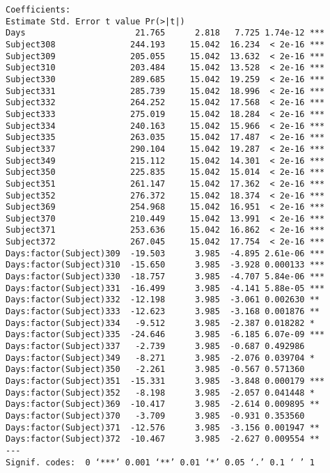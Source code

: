 \documentclass[12pt,letterpaper]{article}
\begin{document}
\begin{enumerate}
\begin{Verbatim}
Coefficients:
Estimate Std. Error t value Pr(>|t|)    
Days                      21.765      2.818   7.725 1.74e-12 ***
Subject308               244.193     15.042  16.234  < 2e-16 ***
Subject309               205.055     15.042  13.632  < 2e-16 ***
Subject310               203.484     15.042  13.528  < 2e-16 ***
Subject330               289.685     15.042  19.259  < 2e-16 ***
Subject331               285.739     15.042  18.996  < 2e-16 ***
Subject332               264.252     15.042  17.568  < 2e-16 ***
Subject333               275.019     15.042  18.284  < 2e-16 ***
Subject334               240.163     15.042  15.966  < 2e-16 ***
Subject335               263.035     15.042  17.487  < 2e-16 ***
Subject337               290.104     15.042  19.287  < 2e-16 ***
Subject349               215.112     15.042  14.301  < 2e-16 ***
Subject350               225.835     15.042  15.014  < 2e-16 ***
Subject351               261.147     15.042  17.362  < 2e-16 ***
Subject352               276.372     15.042  18.374  < 2e-16 ***
Subject369               254.968     15.042  16.951  < 2e-16 ***
Subject370               210.449     15.042  13.991  < 2e-16 ***
Subject371               253.636     15.042  16.862  < 2e-16 ***
Subject372               267.045     15.042  17.754  < 2e-16 ***
Days:factor(Subject)309  -19.503      3.985  -4.895 2.61e-06 ***
Days:factor(Subject)310  -15.650      3.985  -3.928 0.000133 ***
Days:factor(Subject)330  -18.757      3.985  -4.707 5.84e-06 ***
Days:factor(Subject)331  -16.499      3.985  -4.141 5.88e-05 ***
Days:factor(Subject)332  -12.198      3.985  -3.061 0.002630 ** 
Days:factor(Subject)333  -12.623      3.985  -3.168 0.001876 ** 
Days:factor(Subject)334   -9.512      3.985  -2.387 0.018282 *  
Days:factor(Subject)335  -24.646      3.985  -6.185 6.07e-09 ***
Days:factor(Subject)337   -2.739      3.985  -0.687 0.492986    
Days:factor(Subject)349   -8.271      3.985  -2.076 0.039704 *  
Days:factor(Subject)350   -2.261      3.985  -0.567 0.571360    
Days:factor(Subject)351  -15.331      3.985  -3.848 0.000179 ***
Days:factor(Subject)352   -8.198      3.985  -2.057 0.041448 *  
Days:factor(Subject)369  -10.417      3.985  -2.614 0.009895 ** 
Days:factor(Subject)370   -3.709      3.985  -0.931 0.353560    
Days:factor(Subject)371  -12.576      3.985  -3.156 0.001947 ** 
Days:factor(Subject)372  -10.467      3.985  -2.627 0.009554 ** 
---
Signif. codes:  0 ‘***’ 0.001 ‘**’ 0.01 ‘*’ 0.05 ‘.’ 0.1 ‘ ’ 1


\end{Verbatim}
\end{enumerate}
\end{document}

